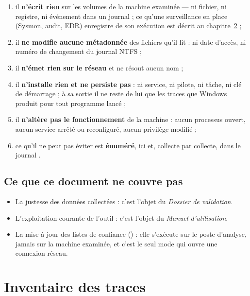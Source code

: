 \documentclass[11pt,a4paper,oneside]{report}
\begin{document}
\begin{enumerate}
  \item il \textbf{n'écrit rien} sur les volumes de la machine examinée — ni
        fichier, ni registre, ni événement dans un journal ; ce qu'une
        surveillance en place (Sysmon, audit, EDR) enregistre de son exécution
        est décrit au chapitre~\ref{ch:traces} ;
  \item il \textbf{ne modifie aucune métadonnée} des fichiers qu'il lit : ni
        date d'accès, ni numéro de changement du journal NTFS ;
  \item il \textbf{n'émet rien sur le réseau} et ne résout aucun nom ;
  \item il \textbf{n'installe rien et ne persiste pas} : ni service, ni pilote,
        ni tâche, ni clé de démarrage ; à sa sortie il ne reste de lui que
        les traces que Windows produit pour tout programme lancé ;
  \item il \textbf{n'altère pas le fonctionnement} de la machine : aucun
        processus ouvert, aucun service arrêté ou reconfiguré, aucun privilège
        modifié ;
  \item ce qu'il ne peut pas éviter est \textbf{énuméré}, ici et, collecte par
        collecte, dans le journal
        .
\end{enumerate}

\section{Ce que ce document ne couvre pas}

\begin{itemize}
  \item La justesse des données collectées : c'est l'objet du \emph{Dossier de
        validation}.
  \item L'exploitation courante de l'outil : c'est l'objet du \emph{Manuel
        d'utilisation}.
  \item La mise à jour des listes de confiance () : elle
        s'exécute sur le poste d'analyse, jamais sur la machine examinée, et
        c'est le seul mode qui ouvre une connexion réseau.
\end{itemize}

\chapter{Inventaire des traces}\label{ch:traces}
\end{document}
